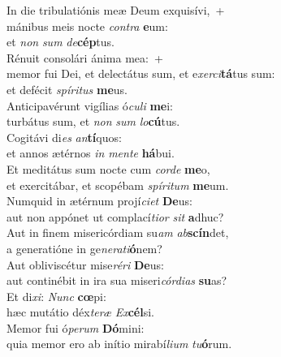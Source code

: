 \evenverse In die tribulatiónis meæ Deum exquisívi,~+\\\evenverse  mánibus meis nocte \textit{con}\textit{tra} \textbf{e}um:~\*\\
\evenverse et \textit{non} \textit{sum} \textit{de}\textbf{cép}tus.\\
\oddverse Rénuit consolári ánima mea:~+\\
\oddverse  memor fui Dei, et delectátus sum, et e\textit{xer}\textit{ci}\textbf{tá}tus sum:~\*\\
\oddverse et defécit \textit{spí}\textit{ri}\textit{tus} \textbf{me}us.\\
\evenverse Anticipavérunt vigílias ó\textit{cu}\textit{li} \textbf{me}i:~\*\\
\evenverse turbátus sum, et \textit{non} \textit{sum} \textit{lo}\textbf{cú}tus.\\
\oddverse Cogitávi di\textit{es} \textit{an}\textbf{tí}quos:~\*\\
\oddverse et annos ætérnos \textit{in} \textit{men}\textit{te} \textbf{há}bui.\\
\evenverse Et meditátus sum nocte cum \textit{cor}\textit{de} \textbf{me}o,~\*\\
\evenverse et exercitábar, et scopébam \textit{spí}\textit{ri}\textit{tum} \textbf{me}um.\\
\oddverse Numquid in ætérnum projí\textit{ci}\textit{et} \textbf{De}us:~\*\\
\oddverse aut non appónet ut complací\textit{ti}\textit{or} \textit{sit} \textbf{a}dhuc?\\
\evenverse Aut in finem misericórdiam su\textit{am} \textit{ab}\textbf{scín}det,~\*\\
\evenverse a generatióne in ge\textit{ne}\textit{ra}\textit{ti}\textbf{ó}nem?\\
\oddverse Aut obliviscétur mise\textit{ré}\textit{ri} \textbf{De}us:~\*\\
\oddverse aut continébit in ira sua miseri\textit{cór}\textit{di}\textit{as} \textbf{su}as?\\
\evenverse Et di\textit{xi}: \textit{Nunc} \textbf{cœ}pi:~\*\\
\evenverse hæc mutátio déx\textit{te}\textit{ræ} \textit{Ex}\textbf{cél}si.\\
\oddverse Memor fui ó\textit{pe}\textit{rum} \textbf{Dó}mini:~\*\\
\oddverse quia memor ero ab inítio mirabí\textit{li}\textit{um} \textit{tu}\textbf{ó}rum.\\
